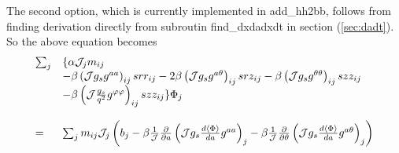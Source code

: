 \documentclass{report}
\newcommand{\ff}[2]{\frac{#1}{#2}}
\newcommand{\pp}[2]{\frac{\partial{#1}}{\partial{#2}}}
\begin{document}
The second option, which is currently implemented in add\_hh2bb,
follows from finding derivation directly from subroutin find\_dxdadxdt
in section (\ref{sec:dadt}). So the above equation becomes
\begin{equation}
\begin{array}{ll}
\sum_j & \{ \alpha {\cal J}_j m_{ij} \\
       & - \beta \left( {\cal J} g_s g^{a a} \right)_{ij} srr_{ij} 
         -2\beta \left( {\cal J} g_s g^{a \theta} \right)_{ij} srz_{ij}
         - \beta \left( {\cal J} g_s g^{\theta \theta} \right)_{ij} szz_{ij}
\\
       & - \beta \left( {\cal J}\ff{g_s}{q^2} g^{\varphi \varphi} \right)_{ij} szz_{ij}
       \} \Phi_j 
\\
\\
 = & \sum_j m_{ij} {\cal J}_j 
       \left( 
        b_j 
- \beta \ff{1}{\cal J} \pp{}{a} \left(
           {\cal J} g_s \ff{d\langle \Phi \rangle}{da} g^{aa}
                                \right)_j
- \beta \ff{1}{\cal J} \pp{}{\theta} \left(
           {\cal J} g_s \ff{d\langle \Phi \rangle}{da} g^{a\theta}
                                     \right)_j
       \right) 
\end{array}
\end{equation}



\end{document}
